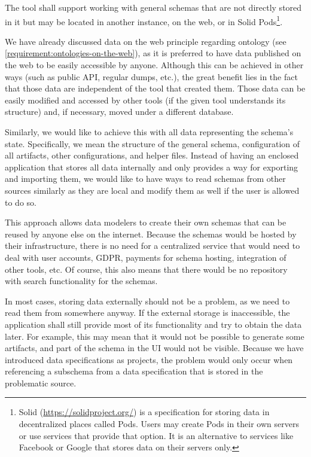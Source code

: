\begin{requirement}
    The tool shall support working with general schemas that are not directly stored in it but may be located in another instance, on the web, or in Solid Pods\footnote{Solid (\url{https://solidproject.org/}) is a specification for storing data in decentralized places called Pods. Users may create Pods in their own servers or use services that provide that option. It is an alternative to services like Facebook or Google that stores data on their servers only.}.
    \label{requirement:schemas-on-the-web}
\end{requirement}

We have already discussed data on the web principle regarding ontology (see \autoref{requirement:ontologies-on-the-web}), as it is preferred to have data published on the web to be easily accessible by anyone. Although this can be achieved in other ways (such as public API, regular dumps, etc.), the great benefit lies in the fact that those data are independent of the tool that created them. Those data can be easily modified and accessed by other tools (if the given tool understands its structure) and, if necessary, moved under a different database.

Similarly, we would like to achieve this with all data representing the schema's state. Specifically, we mean the structure of the general schema, configuration of all artifacts, other configurations, and helper files. Instead of having an enclosed application that stores all data internally and only provides a way for exporting and importing them, we would like to have ways to read schemas from other sources similarly as they are local and modify them as well if the user is allowed to do so.

This approach allows data modelers to create their own schemas that can be reused by anyone else on the internet. Because the schemas would be hosted by their infrastructure, there is no need for a centralized service that would need to deal with user accounts, GDPR, payments for schema hosting, integration of other tools, etc. Of course, this also means that there would be no repository with search functionality for the schemas.

\medskip

In most cases, storing data externally should not be a problem, as we need to read them from somewhere anyway. If the external storage is inaccessible, the application shall still provide most of its functionality and try to obtain the data later. For example, this may mean that it would not be possible to generate some artifacts, and part of the schema in the UI would not be visible. Because we have introduced data specifications as projects, the problem would only occur when referencing a subschema from a data specification that is stored in the problematic source.

